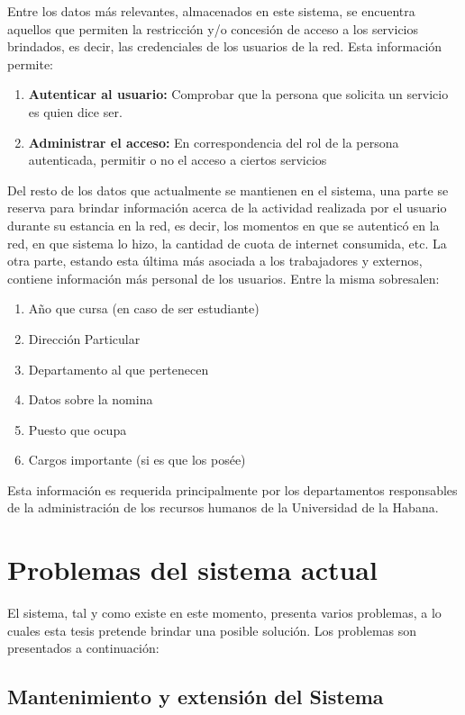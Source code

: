 Entre los datos m\'as relevantes, almacenados en este sistema, se encuentra aquellos que permiten la restricci\'on y/o concesi\'on de acceso a los servicios brindados, es decir, las credenciales de los usuarios de la red. Esta informaci\'on permite:

\begin{enumerate}
\item {\bf Autenticar al usuario:} Comprobar que la persona que solicita un servicio es quien dice ser.
\item {\bf Administrar el acceso:} En correspondencia del rol de la persona autenticada, permitir o no el acceso a ciertos servicios
\end{enumerate}

Del resto de los datos que actualmente se mantienen en el sistema, una parte se reserva para brindar informaci\'on acerca de la actividad realizada por el usuario durante su estancia en la red, es decir, los momentos en que se autentic\'o en la red, en que sistema lo hizo, la cantidad de cuota de internet consumida, etc. La otra parte, estando esta \'ultima m\'as asociada a los trabajadores y externos, contiene informaci\'on m\'as personal de los usuarios. Entre la misma sobresalen: 

\begin{enumerate}
	\item Año que cursa (en caso de ser estudiante)
	\item Direcci\'on Particular
	\item Departamento al que pertenecen
	\item Datos sobre la nomina
	\item Puesto que ocupa
	\item Cargos importante (si es que los pos\'ee)
\end{enumerate}

Esta informaci\'on es requerida principalmente por los departamentos responsables de la administraci\'on de los recursos humanos de la Universidad de la Habana.

\section{Problemas del sistema actual}

El sistema, tal y como existe en este momento, presenta varios problemas, a lo cuales esta tesis pretende brindar una posible soluci\'on. Los problemas son presentados a continuaci\'on:

\subsection{Mantenimiento y extensi\'on del Sistema}

